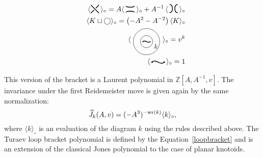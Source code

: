 \begin{eqnarray}
&&\langle \raisebox{-.1cm}{\begin{tikzpicture}[scale=.2]
\draw [line width=0.35mm]  (-1,-1)-- (-0.22,-0.22);
\draw  [line width=0.35mm ](-1,1)--(0,0);
\draw  [line width=0.35mm] (0.22,0.22) -- (1,1);
\draw [line width=0.35mm]   (0,0) -- +(1,-1);
\end{tikzpicture}}\, \rangle_{\circ}=A \langle \, \raisebox{-.07cm}{\begin{tikzpicture}[scale=.2]
\draw [line width=0.35mm] plot [smooth, tension=2] coordinates { (-1,.8) (0, 0.5) (1,.8)};
\draw [ line width=0.35mm] plot [smooth, tension=2] coordinates { (-1,-.8) (0, -0.5) (1,-.8)};
\end{tikzpicture}}\, \rangle_{\circ}   + A^{-1} \,\langle\, \raisebox{-.1cm}{\begin{tikzpicture}[scale=.2]
 \draw [ line width=0.35mm] plot [smooth, tension=2] coordinates { (-1,-1) (-0.3, 0) (-1,1)};
 \draw [ line width=0.35mm] plot [smooth, tension=2] coordinates { (1,-1) (0.3, 0) (1,1)};
 \end{tikzpicture}}\, \rangle_{\circ} \label{regbracket1} \\
&&\langle K \sqcup \bigcirc \rangle_{\circ} = \left (-A^2 - A^{-2}\right ) \langle K \rangle_{\circ} \label{regbracket2}\\
&&\langle \ \begin{tikzpicture}[scale=.06,baseline]
        \draw (4,0) circle (5);
        \draw (4,0) circle (10.8);
         \draw[line width=0.35mm] 
  (1,0) 
    .. controls (3,2) and (5,-2) .. 
  (7,0);  
\draw[black,fill=black] (1,0) circle (2ex);
\draw[black,fill=black] (7,0) circle (2ex);
\draw[dotted] (0:10) -- node[below] {{\small $k$}} (0:13.5);
           \end{tikzpicture}
           \
            \rangle_{\circ} = v^k \label{regbracket3}\\
&&  \langle \, \raisebox{.07cm}{\begin{tikzpicture}[scale=.1, baseline]
\draw[line width=0.35mm] 
  (1,0) 
    .. controls (3,2) and (5,-2) .. 
  (7,0);  
\draw[black,fill=black] (1,0) circle (2ex);
\draw[black,fill=black] (7,0) circle (2ex);
\end{tikzpicture}}\, \rangle_{\circ}  = 1 \label{regbracket4}
\end{eqnarray}

This version of the bracket is a Laurent polynomial in $\mathbb{Z}[A,A^{-1},v]$. The invariance under the first Reidemeister move is given again by the same normalization:
\begin{equation}\label{loopbracket}
\widehat{J}_k(A, v) = (-A^3)^{- {\rm wr}(k)} \langle k \rangle_{\circ},
\end{equation}
where $ \langle k \rangle_{\circ}$ is an evaluation of the diagram $k$ using the rules described above.  The Turaev loop bracket polynomial is  defined by the Equation~\ref{loopbracket} and is an extension of the classical Jones polynomial to the case of planar knotoids.

